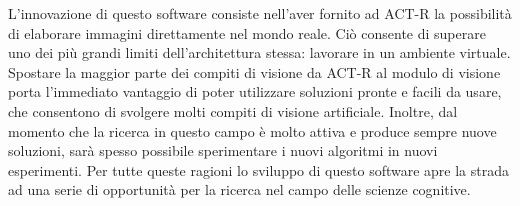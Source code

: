 		L'innovazione di questo software consiste nell'aver fornito ad \mbox{ACT-R} la possibilità di elaborare immagini direttamente nel mondo reale.
		Ciò consente di superare uno dei più grandi limiti dell'architettura stessa: lavorare in un ambiente virtuale.
		Spostare la maggior parte dei compiti di visione da \mbox{ACT-R} al modulo di visione porta l'immediato vantaggio di poter utilizzare soluzioni pronte e facili da usare, che consentono di svolgere molti compiti di visione artificiale.
		Inoltre, dal momento che la ricerca in questo campo è molto attiva e produce sempre nuove soluzioni, sarà spesso possibile sperimentare i nuovi algoritmi in nuovi esperimenti.
		Per tutte queste ragioni lo sviluppo di questo software apre la strada ad una serie di opportunità per la ricerca nel campo delle scienze cognitive.
	

 
		





